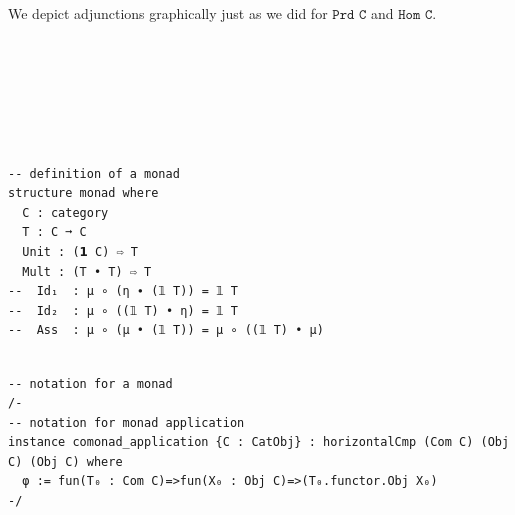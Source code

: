 \documentclass{book}
\newcounter{lcounter}
\newcounter{sectioncount}
\newcounter{subsectioncount}
\renewcommand{\section}[1]{\newpage
\ \\
\ \\
 \begin{center} \scalebox{1.5}{\texttt{\thesectioncount . #1}} \setcounter{sectioncount}{\thesectioncount+1} \setcounter{subsectioncount}{1} \end{center}
 \begin{center}

\ \\
\ \\

\thispagestyle{empty}
\end{center}
}
\begin{document}
We depict adjunctions graphically just as we did for $\texttt{Prd C}$ and $\texttt{Hom C}$.

\section{\texttt{monad}}


\begin{center}
\begin{tcolorbox}[width=5in,colback={white},title={\begin{center}\texttt{Lean \thelcounter} \addtocounter{lcounter}{1}  \end{center}},colbacktitle=Blue,coltitle=black]
\begin{verbatim}

-- definition of a monad
structure monad where
  C : category
  T : C ➞ C
  Unit : (𝟭 C) ⇨ T
  Mult : (T • T) ⇨ T
--  Id₁  : μ ∘ (η ∙ (𝟙 T)) = 𝟙 T
--  Id₂  : μ ∘ ((𝟙 T) • η) = 𝟙 T
--  Ass  : μ ∘ (μ • (𝟙 T)) = μ ∘ ((𝟙 T) • μ)

\end{verbatim}%
\end{tcolorbox}
\end{center}



\begin{center}
\begin{tcolorbox}[width=5in,colback={white},title={\begin{center}\texttt{Lean \thelcounter} \addtocounter{lcounter}{1}  \end{center}},colbacktitle=Green,coltitle=black]
\begin{verbatim}

-- notation for a monad
/- 
-- notation for monad application
instance comonad_application {C : CatObj} : horizontalCmp (Com C) (Obj C) (Obj C) where
  φ := fun(T₀ : Com C)=>fun(X₀ : Obj C)=>(T₀.functor.Obj X₀)
-/

\end{verbatim}%
\end{tcolorbox}
\end{center}


\section{\texttt{comonad}}
\end{document}

